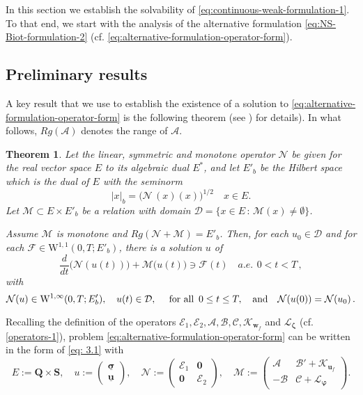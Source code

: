 \documentclass[11pt]{article}
\numberwithin{equation}{section}
\newcommand{\bsi}{{\boldsymbol\sigma}}
\newcommand{\bvarphi}{{\boldsymbol\varphi}}
\newcommand{\bzeta}{{\boldsymbol\zeta}}
\newcommand{\ubsi}{\underline{\bsi}}
\newcommand{\ubu}{\underline{\bu}}
\newcommand{\bw}{{\mathbf{w}}}
\newcommand{\bu}{\mathbf{u}}
\newcommand{\0}{{\mathbf{0}}}
\def\bQ{\mathbf{Q}}
\def\bS{\mathbf{S}}
\newcommand{\cA}{\mathcal{A}}
\newcommand{\cB}{\mathcal{B}}
\newcommand{\cC}{\mathcal{C}}
\newcommand{\cE}{\mathcal{E}}
\newcommand{\cF}{\mathcal{F}}
\newcommand{\cN}{\mathcal{N}}
\newcommand{\cM}{\mathcal{M}}
\newcommand{\cK}{\mathcal{K}}
\newcommand{\cL}{\mathcal{L}}
\newcommand{\cD}{\mathcal{D}}
\def\W{\mathrm{W}}
\def\qan{{\quad\hbox{and}\quad}}
\newtheorem{thm}{Theorem}[section]
\numberwithin{equation}{section}
\begin{document}
In this section we establish the solvability of \eqref{eq:continuous-weak-formulation-1}. To that end, we start with the analysis of the alternative formulation \eqref{eq:NS-Biot-formulation-2} (cf. \eqref{eq:alternative-formulation-operator-form}).

\subsection{Preliminary results}

A key result that we use to establish the existence of a solution to \eqref{eq:alternative-formulation-operator-form} is the following theorem (see \cite[Theorem~IV.6.1(b)]{Showalter}) for details). In what follows, $Rg(\cA) $ denotes the range of $\cA$.
\begin{thm}\label{thm:auxiliary-theorem}
Let the linear, symmetric and monotone operator $\cN$ be given for the real vector space $E$ to its algebraic dual $E^*$, and let $E'_b$ be the Hilbert space which is the dual of $E$ with the seminorm
\begin{equation*}
|x|_b = \big(\cN\,(x)(x)\big)^{1/2} \quad x\in E.
\end{equation*}
Let $\cM\subset E\times E'_b$ be a relation with domain $\cD = \Big\{ x\in E \,:\, \cM(x) \neq \emptyset \Big\}$.

Assume $\cM$ is monotone and $Rg(\cN + \cM) = E'_b$.
Then, for each $u_0\in \cD$ and for each $\cF\in \W^{1,1}(0,T;E'_b)$, there is a solution $u$ of
\begin{equation}\label{eq: 3.1}
\frac{d}{dt}\big(\cN(u(t))\big) + \cM\big(u(t)\big) \ni \cF(t) \quad a.e. \, \ 0 < t < T\,,
\end{equation}
with
\begin{equation*}
\cN(u)\in \W^{1,\infty}(0,T;E'_b),\quad u(t)\in \cD,\quad \mbox{ for all }\, 0\leq t\leq T,\qan \cN(u(0)) = \cN(u_0)\,.
\end{equation*}
\end{thm}
Recalling the definition of the operators $\cE_1, \cE_2, \cA, \cB, \cC, \cK_{\bw_f}$ and $\cL_{\bzeta}$ (cf. \eqref{operators-1}), problem \eqref{eq:alternative-formulation-operator-form} can be written in the form of \eqref{eq: 3.1} with
%
\begin{equation}\label{eq:defn-E-N-M}
E:= \bQ\times \bS, \quad u:= 
\left(\begin{array}{c}
\ubsi \\ \ubu
\end{array}\right),\quad 
\cN:= \begin{pmatrix}
\cE_1 & \0 \\
\0 & \cE_2
\end{pmatrix},\quad 
\cM:= \begin{pmatrix}
\cA & \cB' + \cK_{\bu_f} \\
-\cB  & \cC + \cL_{\bvarphi}
\end{pmatrix}.
\end{equation}
\end{document}
